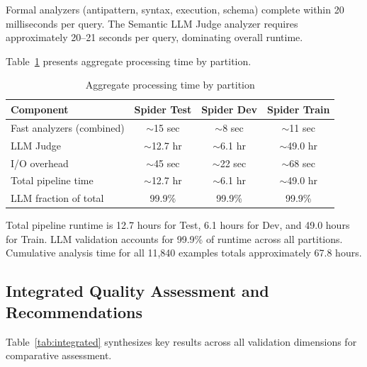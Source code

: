\documentclass[print]{einformatica}
\begin{document}
Formal analyzers (antipattern, syntax, execution, schema) complete within 20 milliseconds per query. The Semantic LLM Judge analyzer requires approximately 20--21 seconds per query, dominating overall runtime.

Table~\ref{tab:aggregate_performance} presents aggregate processing time by partition.

\begin{table}[ht]
    \caption{Aggregate processing time by partition}
    \label{tab:aggregate_performance}
    \centering
    \footnotesize
    \begin{tabular}{lccc}
        \toprule
        \textbf{Component} & \textbf{Spider Test} & \textbf{Spider Dev} & \textbf{Spider Train} \\
        \midrule
        Fast analyzers (combined) & $\sim$15 sec & $\sim$8 sec & $\sim$11 sec \\
        LLM Judge & $\sim$12.7 hr & $\sim$6.1 hr & $\sim$49.0 hr \\
        I/O overhead & $\sim$45 sec & $\sim$22 sec & $\sim$68 sec \\
        Total pipeline time & $\sim$12.7 hr & $\sim$6.1 hr & $\sim$49.0 hr \\
        LLM fraction of total & 99.9\% & 99.9\% & 99.9\% \\
        \bottomrule
    \end{tabular}
\end{table}

Total pipeline runtime is 12.7 hours for Test, 6.1 hours for Dev, and 49.0 hours for Train. LLM validation accounts for 99.9\% of runtime across all partitions. Cumulative analysis time for all 11,840 examples totals approximately 67.8 hours.

\subsection{Integrated Quality Assessment and Recommendations}\label{sec:integrated}

Table~\ref{tab:integrated} synthesizes key results across all validation dimensions for comparative assessment.
\end{document}
